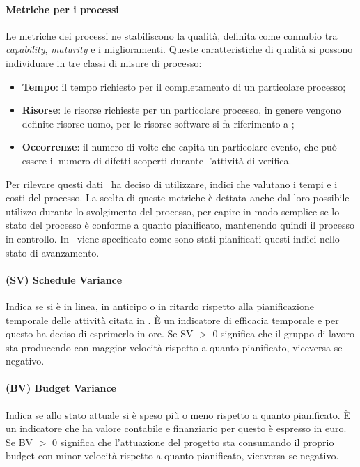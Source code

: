 \paragraph{Metriche per i processi}
Le metriche dei processi ne stabiliscono la qualità, definita come connubio tra \textit{capability}, \textit{maturity} e i miglioramenti. Queste caratteristiche di qualità si possono individuare in tre classi di misure di processo:
\begin{itemize}
\item \textbf{Tempo}: il tempo richiesto per il completamento di un particolare processo;
\item \textbf{Risorse}: le risorse richieste per un particolare processo, in genere vengono definite risorse-uomo, per le risorse software si fa riferimento a \infoNDP;
\item \textbf{Occorrenze}: il numero di volte che capita un particolare evento, che può essere il numero di difetti scoperti durante l'attività di verifica.
\end{itemize}
Per rilevare questi dati \gruppo ~ha deciso di utilizzare, indici che valutano i tempi e i costi del processo. La scelta di queste metriche è dettata anche dal loro possibile utilizzo durante lo svolgimento del processo, per capire in modo semplice se lo stato del processo è conforme a quanto pianificato, mantenendo quindi il processo in controllo. In \infoPDP ~viene specificato come sono stati pianificati questi indici nello stato di avanzamento.
\paragraph{(SV) Schedule Variance}
Indica se si è in linea, in anticipo o in ritardo rispetto alla pianificazione temporale delle attività citata in \infoPDP.
È un indicatore di efficacia temporale e per questo \gruppo ha deciso di esprimerlo in ore.
Se SV $>$ 0 significa che il gruppo di lavoro sta producendo con maggior velocità rispetto a quanto pianificato, viceversa se negativo.\\

\paragraph{(BV) Budget Variance}
Indica se allo stato attuale si è speso più o meno rispetto a quanto pianificato.
È un indicatore che ha valore contabile e finanziario per questo è espresso in euro.
Se BV $>$ 0 significa che l’attuazione del progetto sta consumando il proprio budget con minor velocità rispetto a quanto pianificato, viceversa se negativo.

